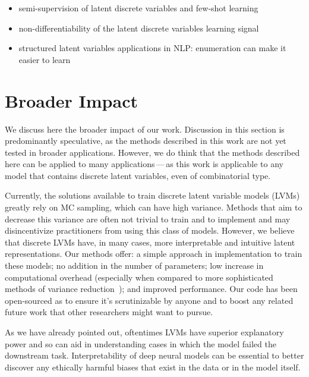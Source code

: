 \begin{itemize}
    \item semi-supervision of latent discrete variables and few-shot learning
    \item non-differentiability of the latent discrete variables learning signal
    \item structured latent variables applications in NLP: enumeration can make it easier to learn
\end{itemize}

\section{Broader Impact}\label{sec:impact}

We discuss here the broader impact of our work. Discussion in this
section is predominantly speculative, as the methods described in
this work are not yet tested in broader applications. However, we do
think that the methods described here can be applied to many
applications\,---\,as this work is applicable to any model that
contains discrete latent variables, even of combinatorial type.

Currently, the solutions available to train discrete latent variable
models (LVMs) greatly rely on MC sampling, which can have high variance.
Methods that aim to decrease this variance are often not trivial to
train and to implement and may disincentivize practitioners from
using this class of models. However, we believe that discrete LVMs
have, in many cases, more interpretable and intuitive
latent representations. Our methods offer: a simple approach in
implementation to train these models; no addition in the number of
parameters; low increase in computational overhead (especially when
compared to more sophisticated methods of variance
reduction~\citep{RB19}); and improved performance. Our code has been
open-sourced as to ensure it's scrutinizable by
anyone and to boost any related future work that other researchers
might want to pursue.

As we have already pointed out, oftentimes LVMs
have superior explanatory power and so can aid in understanding cases
in which the model failed the downstream task. Interpretability of
deep neural models can be essential to better discover any ethically
harmful biases that exist in the data or in the model itself.

